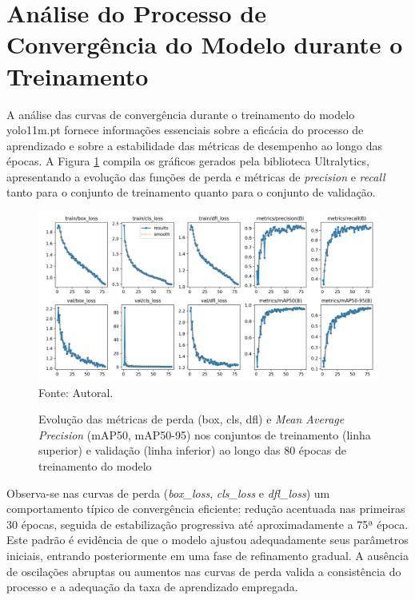 \section{\textbf{Análise do Processo de Convergência do Modelo durante o Treinamento}}

A análise das curvas de convergência durante o treinamento do modelo yolo11m.pt fornece informações essenciais sobre a eficácia do processo de aprendizado e sobre a estabilidade das métricas de desempenho ao longo das épocas. A Figura \ref{fg-results} compila os gráficos gerados pela biblioteca Ultralytics, apresentando a evolução das funções de perda e métricas de \textit{precision} e \textit{recall} tanto para o conjunto de treinamento quanto para o conjunto de validação.

\begin{figure}[htbp]
  \centering
  \caption{Evolução das métricas de perda (box, cls, dfl) e \textit{Mean Average Precision} (mAP50, mAP50-95) nos conjuntos de treinamento (linha superior) e validação (linha inferior) ao longo das 80 épocas de treinamento do modelo}
  \includegraphics[width=1\textwidth]{Figuras/results.png}
  \\
  Fonte: Autoral.
  \label{fg-results}
\end{figure}

Observa-se nas curvas de perda (\textit{box\_loss}, \textit{cls\_loss} e \textit{dfl\_loss}) um comportamento típico de convergência eficiente: redução acentuada nas primeiras 30 épocas, seguida de estabilização progressiva até aproximadamente a 75ª época. Este padrão é evidência de que o modelo ajustou adequadamente seus parâmetros iniciais, entrando posteriormente em uma fase de refinamento gradual. A ausência de oscilações abruptas ou aumentos nas curvas de perda valida a consistência do processo e a adequação da taxa de aprendizado empregada.

